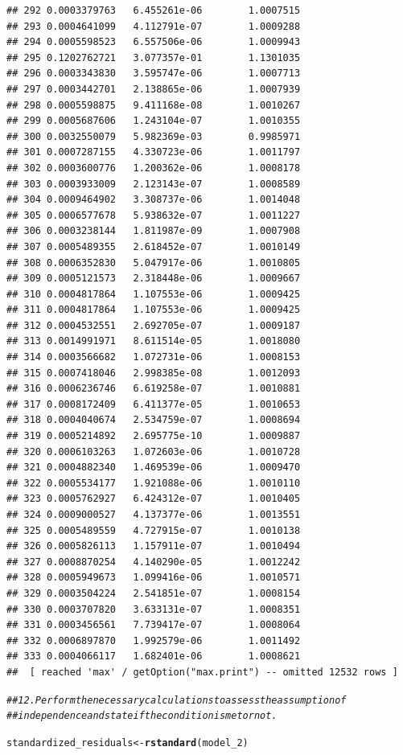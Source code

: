 \documentclass{article}\usepackage[]{graphicx}\usepackage[]{xcolor}
\makeatletter
\newcommand{\hlcom}[1]{\textcolor[rgb]{0.678,0.584,0.686}{\textit{#1}}}%
\newcommand{\hlstd}[1]{\textcolor[rgb]{0.345,0.345,0.345}{#1}}%
\newcommand{\hlkwb}[1]{\textcolor[rgb]{0.69,0.353,0.396}{#1}}%
\newcommand{\hlkwd}[1]{\textcolor[rgb]{0.737,0.353,0.396}{\textbf{#1}}}%
\newenvironment{kframe}{%
 \def\at@end@of@kframe{}%
 \ifinner\ifhmode%
  \def\at@end@of@kframe{\end{minipage}}%
  \begin{minipage}{\columnwidth}%
 \fi\fi%
 \def\FrameCommand##1{\hskip\@totalleftmargin \hskip-\fboxsep
 \colorbox{shadecolor}{##1}\hskip-\fboxsep
     \hskip-\linewidth \hskip-\@totalleftmargin \hskip\columnwidth}%
 \MakeFramed {\advance\hsize-\width
   \@totalleftmargin\z@ \linewidth\hsize
   \@setminipage}}%
 {\par\unskip\endMakeFramed%
 \at@end@of@kframe}
\newenvironment{knitrout}{}{} %
\makeatother
\begin{document}
\begin{knitrout}
\begin{kframe}
\begin{verbatim}
## 292 0.0003379763   6.455261e-06        1.0007515
## 293 0.0004641099   4.112791e-07        1.0009288
## 294 0.0005598523   6.557506e-06        1.0009943
## 295 0.1202762721   3.077357e-01        1.1301035
## 296 0.0003343830   3.595747e-06        1.0007713
## 297 0.0003442701   2.138865e-06        1.0007939
## 298 0.0005598875   9.411168e-08        1.0010267
## 299 0.0005687606   1.243104e-07        1.0010355
## 300 0.0032550079   5.982369e-03        0.9985971
## 301 0.0007287155   4.330723e-06        1.0011797
## 302 0.0003600776   1.200362e-06        1.0008178
## 303 0.0003933009   2.123143e-07        1.0008589
## 304 0.0009464902   3.308737e-06        1.0014048
## 305 0.0006577678   5.938632e-07        1.0011227
## 306 0.0003238144   1.811987e-09        1.0007908
## 307 0.0005489355   2.618452e-07        1.0010149
## 308 0.0006352830   5.047917e-06        1.0010805
## 309 0.0005121573   2.318448e-06        1.0009667
## 310 0.0004817864   1.107553e-06        1.0009425
## 311 0.0004817864   1.107553e-06        1.0009425
## 312 0.0004532551   2.692705e-07        1.0009187
## 313 0.0014991971   8.611514e-05        1.0018080
## 314 0.0003566682   1.072731e-06        1.0008153
## 315 0.0007418046   2.998385e-08        1.0012093
## 316 0.0006236746   6.619258e-07        1.0010881
## 317 0.0008172409   6.411377e-05        1.0010653
## 318 0.0004040674   2.534759e-07        1.0008694
## 319 0.0005214892   2.695775e-10        1.0009887
## 320 0.0006103263   1.072603e-06        1.0010728
## 321 0.0004882340   1.469539e-06        1.0009470
## 322 0.0005534177   1.921088e-06        1.0010110
## 323 0.0005762927   6.424312e-07        1.0010405
## 324 0.0009000527   4.137377e-06        1.0013551
## 325 0.0005489559   4.727915e-07        1.0010138
## 326 0.0005826113   1.157911e-07        1.0010494
## 327 0.0008870254   4.140290e-05        1.0012242
## 328 0.0005949673   1.099416e-06        1.0010571
## 329 0.0003504224   2.541851e-07        1.0008154
## 330 0.0003707820   3.633131e-07        1.0008351
## 331 0.0003456561   7.739417e-07        1.0008064
## 332 0.0006897870   1.992579e-06        1.0011492
## 333 0.0004066117   1.682401e-06        1.0008621
##  [ reached 'max' / getOption("max.print") -- omitted 12532 rows ]
\end{verbatim}
\begin{alltt}
\hlcom{## 12. Perform the necessary calculations to assess the assumption of }
\hlcom{## independence and state if the condition is met or not.}

\hlstd{standardized_residuals} \hlkwb{<-} \hlkwd{rstandard}\hlstd{(model_2)}



\end{alltt}
\end{kframe}
\end{knitrout}
\end{document}
